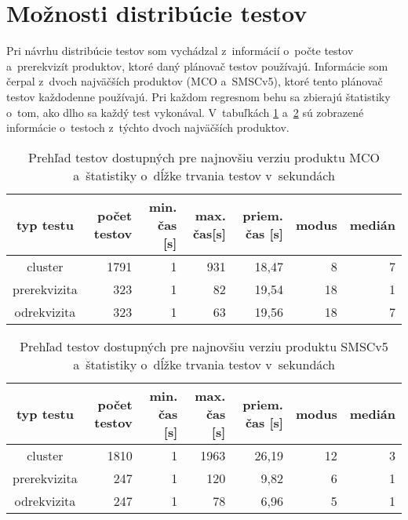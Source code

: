\section{Možnosti distribúcie testov}
\label{sekcia:moznosti_distribucie}
Pri návrhu distribúcie testov som vychádzal z~informácií o~počte 
testov a~prerekvizít produktov, ktoré daný plánovač testov používajú. 
Informácie som čerpal z~dvoch najväčších produktov (MCO a~SMSCv5), 
ktoré tento plánovač testov každodenne používajú. 
Pri každom regresnom behu sa zbierajú štatistiky o~tom,
ako dlho sa každý test vykonával. 
V~tabuľkách \ref{tabulka:testy_mco} a~\ref{tabulka:testy_smsc} sú 
zobrazené informácie o~testoch z~týchto dvoch najväčších produktov.

\begin{table}
  \begin{center}
    \begin{tabular}{| c | r | r | r | r | r | r |}
    \hline
    typ testu & počet testov & min. čas [s] & max. čas[s] & 
    priem. čas [s] & modus & medián \\ \hline
    cluster      & 1791 & 1 & 931 & 18,47 & 8  & 7 \\ \hline
    prerekvizita & 323  & 1 & 82  & 19,54 & 18 & 1 \\ \hline
    odrekvizita  & 323  & 1 & 63  & 19,56 & 18 & 7 \\
    \hline
    \end{tabular}
    \caption{Prehľad testov dostupných pre najnovšiu verziu produktu MCO 
             a~štatistiky o~dĺžke trvania testov v~sekundách}
    \label{tabulka:testy_mco}
  \end{center}
\end{table}

\begin{table}
  \begin{center}
    \begin{tabular}{| c | r | r | r | r | r | r |}
    \hline
    typ testu & počet testov & min. čas [s] & max. čas [s] & 
    priem. čas [s] & modus & medián \\ \hline
    cluster      & 1810 & 1 & 1963 & 26,19 & 12 & 3 \\ \hline
    prerekvizita & 247  & 1 & 120  & 9,82  & 6  & 1 \\ \hline
    odrekvizita  & 247  & 1 & 78   & 6,96  & 5  & 1 \\
    \hline
    \end{tabular}
    \caption{Prehľad testov dostupných pre najnovšiu verziu produktu SMSCv5 
             a~štatistiky o~dĺžke trvania testov v~sekundách}
    \label{tabulka:testy_smsc}
  \end{center}
\end{table}

